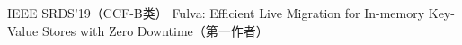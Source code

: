 \cvpub
{IEEE SRDS'19（CCF-B类）} %
{Fulva: Efficient Live Migration for In-memory Key-Value Stores with Zero Downtime（第一作者）} %
{} %
{} %
{ %
}
